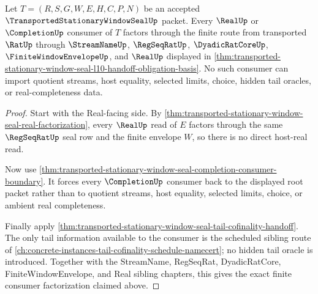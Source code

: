 \begin{theorem}
\label{thm:transported-stationary-window-seal-real-regseq-consumer-exactness}
Let $T=(R,S,G,W,E,H,C,P,N)$ be an accepted $\TransportedStationaryWindowSealUp$ packet. Every $\RealUp$ or $\CompletionUp$ consumer of $T$ factors through the finite route from transported $\RatUp$ through $\StreamNameUp$, $\RegSeqRatUp$, $\DyadicRatCoreUp$, $\FiniteWindowEnvelopeUp$, and $\RealUp$ displayed in \autoref{thm:transported-stationary-window-seal-l10-handoff-obligation-basis}. No such consumer can import quotient streams, host equality, selected limits, choice, hidden tail oracles, or real-completeness data.
\end{theorem}
\begin{proof}
Start with the Real-facing side. By \autoref{thm:transported-stationary-window-seal-real-factorization}, every $\RealUp$ read of $E$ factors through the same $\RegSeqRatUp$ seal row and the finite envelope $W$, so there is no direct host-real read.

Now use \autoref{thm:transported-stationary-window-seal-completion-consumer-boundary}. It forces every $\CompletionUp$ consumer back to the displayed root packet rather than to quotient streams, host equality, selected limits, choice, or ambient real completeness.

Finally apply \autoref{thm:transported-stationary-window-seal-tail-cofinality-handoff}. The only tail information available to the consumer is the scheduled sibling route of \autoref{ch:concrete-instances-tail-cofinality-schedule-namecert}; no hidden tail oracle is introduced. Together with the StreamName, RegSeqRat, DyadicRatCore, FiniteWindowEnvelope, and Real sibling chapters, this gives the exact finite consumer factorization claimed above.
\end{proof}

